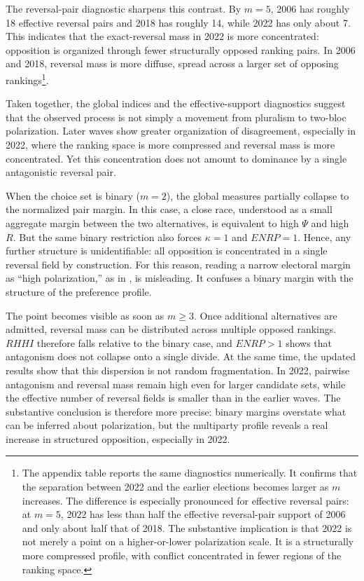 \documentclass[12pt]{article}
\begin{document}
The reversal-pair diagnostic sharpens this contrast. By \(m=5\), 2006 has roughly 18 effective reversal pairs and 2018 has roughly 14, while 2022 has only about 7. This indicates that the exact-reversal mass in 2022 is more concentrated: opposition is organized through fewer structurally opposed ranking pairs. In 2006 and 2018, reversal mass is more diffuse, spread across a larger set of opposing rankings\footnote{The appendix table reports the same diagnostics numerically. It confirms that the separation between 2022 and the earlier elections becomes larger as \(m\) increases. The difference is especially pronounced for effective reversal pairs: at \(m=5\), 2022 has less than half the effective reversal-pair support of 2006 and only about half that of 2018. The substantive implication is that 2022 is not merely a point on a higher-or-lower polarization scale. It is a structurally more compressed profile, with conflict concentrated in fewer regions of the ranking space.}.



Taken together, the global indices and the effective-support diagnostics suggest that the observed process is not simply a movement from pluralism to two-bloc polarization. Later waves show greater organization of disagreement, especially in 2022, where the ranking space is more compressed and reversal mass is more concentrated. Yet this concentration does not amount to dominance by a single antagonistic reversal pair.

When the choice set is binary (\(m=2\)), the global measures partially
collapse to the normalized pair margin. In this case, a close race, understood
as a small aggregate margin between the two alternatives, is equivalent to high
\(\Psi\) and high \(R\). But the same binary restriction also forces
\(\kappa=1\) and \(ENRP=1\). Hence, any further structure is unidentifiable:
all opposition is concentrated in a single reversal field by construction.
For this reason, reading a narrow electoral margin as ``high polarization,''
as in \textcite[pp.~17--18]{nunes2023biografia}, is misleading. It confuses
a binary margin with the structure of the preference profile.

The point becomes visible as soon as \(m\geq 3\). Once additional alternatives
are admitted, reversal mass can be distributed across multiple opposed
rankings. \(RHHI\) therefore falls relative to the binary case, and
\(ENRP>1\) shows that antagonism does not collapse onto a single divide.
At the same time, the updated results show that this dispersion is not random
fragmentation. In 2022, pairwise antagonism and reversal mass remain high even
for larger candidate sets, while the effective number of reversal fields is
smaller than in the earlier waves. The substantive conclusion is therefore
more precise: binary margins overstate what can be inferred about
polarization, but the multiparty profile reveals a real increase in structured
opposition, especially in 2022.
 
\end{document}
